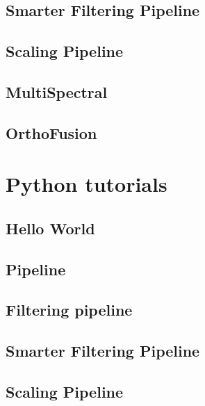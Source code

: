\subsection{Smarter Filtering Pipeline}


\subsection{Scaling Pipeline}


\subsection{MultiSpectral}


\subsection{OrthoFusion}



\normalsize
\section{Python tutorials}\label{sec:tutoPython}
\subsection{Hello World}


\subsection{Pipeline}


\subsection{Filtering pipeline}


\subsection{Smarter Filtering Pipeline}


\subsection{Scaling Pipeline}


